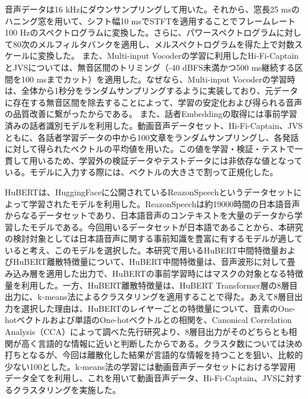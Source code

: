 \documentclass[12pt]{jarticle}
\numberwithin{equation}{section}    %
\numberwithin{figure}{section}      %
\numberwithin{table}{section}      %
\begin{document}
音声データは16 kHzにダウンサンプリングして用いた。それから、窓長25 msのハニング窓を用いて、シフト幅10 msでSTFTを適用することでフレームレート100 Hzのスペクトログラムに変換した。さらに、パワースペクトログラムに対して80次のメルフィルタバンクを適用し、メルスペクトログラムを得た上で対数スケールに変換した。
また、Multi-input Vocoderの学習に利用したHi-Fi-CaptainとJVSについては、無音区間のトリミング（-40 dBFS未満かつ500 ms継続する区間を100 msまでカット）を適用した。なぜなら、Multi-input Vocoderの学習時は、全体から1秒分をランダムサンプリングするように実装しており、元データに存在する無音区間を除去することによって、学習の安定化および得られる音声の品質改善に繋がったからである。
また、話者Embeddingの取得には事前学習済みの話者識別モデル\cite{wan2018generalized}を利用した。動画音声データセット、Hi-Fi-Captain、JVSともに、各話者学習データの中から100文章をランダムサンプリングし、各発話に対して得られたベクトルの平均値を用いた。この値を学習・検証・テストで一貫して用いるため、学習外の検証データやテストデータには非依存な値となっている。モデルに入力する際には、ベクトルの大きさで割って正規化した。

HuBERTは、HuggingFaceに公開されているReazonSpeechというデータセットによって学習されたモデル\cite{rinna-japanese-hubert-base,sawada2024release}を利用した。ReazonSpeechは約19000時間の日本語音声からなるデータセットであり、日本語音声のコンテキストを大量のデータから学習したモデルである。今回用いるデータセットが日本語であることから、本研究の検討対象としては日本語音声に関する事前知識を豊富に有するモデルが適していると考え、このモデルを選択した。本研究で用いるHuBERT中間特徴量およびHuBERT離散特徴量について、HuBERT中間特徴量は、音声波形に対して畳み込み層を適用した出力で、HuBERTの事前学習時にはマスクの対象となる特徴量を利用した。一方、HuBERT離散特徴量は、HuBERT Transformer層の8層目出力に、k-means法によるクラスタリングを適用することで得た。あえて8層目出力を選択した理由は、HuBERTのレイヤーごとの特徴量について、音素のOne-hotベクトルおよび単語のOne-hotベクトルとの相関を、Canonical Correlation Analysis（CCA）によって調べた先行研究\cite{pasad2023comparative}より、8層目出力がそのどちらとも相関が高く言語的な情報に近いと判断したからである。クラスタ数については決め打ちとなるが、今回は離散化した結果が言語的な情報を持つことを狙い、比較的少ない100とした。k-means法の学習には動画音声データセットにおける学習用データ全てを利用し、これを用いて動画音声データ、Hi-Fi-Captain、JVSに対するクラスタリングを実施した。
\end{document}
